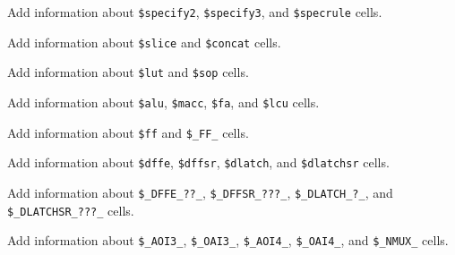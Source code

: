 \begin{fixme}
Add information about {\tt \$specify2}, {\tt \$specify3}, and {\tt \$specrule} cells.
\end{fixme}

\begin{fixme}
Add information about {\tt \$slice} and {\tt \$concat} cells.
\end{fixme}

\begin{fixme}
Add information about {\tt \$lut} and {\tt \$sop} cells.
\end{fixme}

\begin{fixme}
Add information about {\tt \$alu}, {\tt \$macc}, {\tt \$fa}, and {\tt \$lcu} cells.
\end{fixme}

\begin{fixme}
Add information about {\tt \$ff} and {\tt \$\_FF\_} cells.
\end{fixme}

\begin{fixme}
Add information about {\tt \$dffe}, {\tt \$dffsr}, {\tt \$dlatch}, and {\tt \$dlatchsr} cells.
\end{fixme}

\begin{fixme}
Add information about {\tt \$\_DFFE\_??\_}, {\tt \$\_DFFSR\_???\_}, {\tt \$\_DLATCH\_?\_}, and {\tt \$\_DLATCHSR\_???\_} cells.
\end{fixme}

\begin{fixme}
Add information about {\tt \$\_AOI3\_}, {\tt \$\_OAI3\_}, {\tt \$\_AOI4\_}, {\tt \$\_OAI4\_}, and {\tt \$\_NMUX\_} cells.
\end{fixme}

